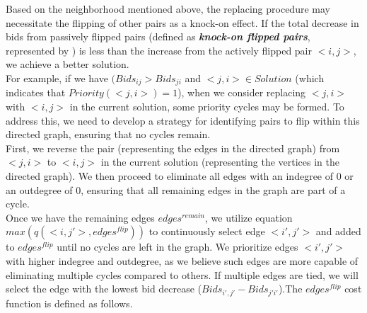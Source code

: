 \documentclass{article}
\begin{document}
Based on the neighborhood mentioned above, the replacing procedure may necessitate the flipping of other pairs as a knock-on effect. If the total decrease in bids from passively flipped pairs (defined as \textbf{\textit{knock-on flipped pairs}}, represented by ) is less than the increase from the actively flipped pair $<i,j>$, we achieve a better solution.\\
For example, if we have $(Bids_{ij} > Bids_{ji}$ and $<j,i> \in Solution$ (which indicates that $Priority(<j,i>) = 1$), when we consider replacing $<j,i>$ with $<i,j>$ in the current solution, some priority cycles may be formed. To address this, we need to develop a strategy for identifying pairs to flip within this directed graph, ensuring that no cycles remain.\\
First, we reverse the pair (representing the edges in the directed graph) from $<j, i>$ to $<i, j>$ in the current solution (representing the vertices in the directed graph). We then proceed to eliminate all edges with an indegree of 0 or an outdegree of 0, ensuring that all remaining edges in the graph are part of a cycle.\\
Once we have the remaining edges $edges^{remain}$, we utilize equation $max(q(<i,j'>, edges^{flip}))$ to continuously select edge $<i',j'>$ and added to $edges^{flip}$ until no cycles are left in the graph. We prioritize edges $<i', j'>$ with higher indegree and outdegree, as we believe such edges are more capable of eliminating multiple cycles compared to others. If multiple edges are tied, we will select the edge with the lowest bid decrease ($Bids_{i',j'} - Bids_{j'i'}$).The $edges^{flip}$ cost function is defined as follows.\\
\newpage
\end{document}
